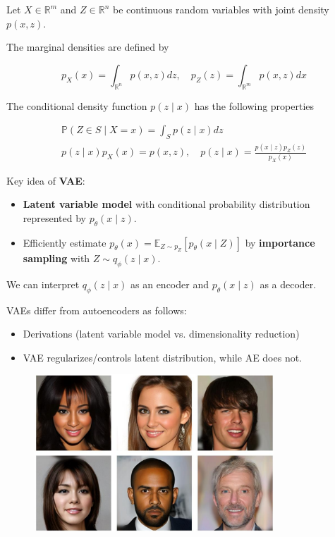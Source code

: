 \documentclass{report}
\begin{document}
\begin{concept}
    Let $X \in \mathbb{R}^{m}$ and $Z \in \mathbb{R}^{n}$ be continuous random variables with joint density $p(x, z)$.

    The marginal densities are defined by

    $$
    p_{X}(x)=\int_{\mathbb{R}^{n}} p(x, z) d z, \quad p_{Z}(z)=\int_{\mathbb{R}^{m}} p(x, z) d x
    $$

    The conditional density function $p(z \mid x)$ has the following properties

    $$
    \begin{gathered}
    \mathbb{P}(Z \in S \mid X=x)=\int_{S} p(z \mid x) d z \\
    p(z \mid x) p_{X}(x)=p(x, z), \quad p(z \mid x)=\frac{p(x \mid z) p_{Z}(z)}{p_{X}(x)}
    \end{gathered}
    $$
\end{concept}

\begin{concept}
    Key idea of \textbf{VAE}:

    \begin{itemize}
        \item \textbf{Latent variable model} with conditional probability distribution represented by $p_{\theta}(x \mid z)$.
        \item Efficiently estimate $p_{\theta}(x)=\mathbb{E}_{Z \sim p_{Z}}\left[p_{\theta}(x \mid Z)\right]$ by \textbf{importance sampling} with $Z \sim q_{\phi}(z \mid x)$.
    \end{itemize}

    We can interpret $q_{\phi}(z \mid x)$ as an encoder and $p_{\theta}(x \mid z)$ as a decoder.

    VAEs differ from autoencoders as follows:

    \begin{itemize}
        \item Derivations (latent variable model vs. dimensionality reduction)
        \item VAE regularizes/controls latent distribution, while AE does not.
    \end{itemize}
\end{concept}

\begin{figure}[H]
    \centering
    \includegraphics[width=0.8\textwidth]{.././assets/11.1.png}
\end{figure}
\end{document}
